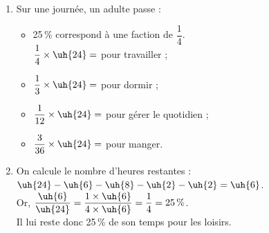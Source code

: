    \ \\ [-5mm]
   \begin{enumerate}
      \item Sur une journée, un adulte passe : \smallskip
      \begin{itemize}
         \item 25\,\% correspond à une faction de $\dfrac14$. \\ [2mm]
            \quad $\dfrac14\times\uh{24} =$ {\blue {} pour travailler} ; \\ [2mm]
         \item $\dfrac13\times\uh{24} =$ {\blue {} pour dormir} ; \\ [2mm]
         \item $\dfrac1{12}\times\uh{24} =$ {\blue {} pour gérer le quotidien} ; \\ [2mm]
         \item $\dfrac{3}{36}\times\uh{24} =$ {\blue {} pour manger.} \\ [3mm]
      \end{itemize}
      \item On calcule le nombre d'heures restantes : \\
          $\uh{24}-\uh{6}-\uh{8}-\uh{2}-\uh{2} =\uh{6}$. \\ [2mm]
         Or, $\dfrac{\uh{6}}{\uh{24}} =\dfrac{1\times\uh{6}}{4\times\uh{6}} =\dfrac14 =25\,\%$. \\ [2mm]
         {\blue Il lui reste donc 25\,\% de son temps pour les loisirs}. \bigskip
   \end{enumerate}
